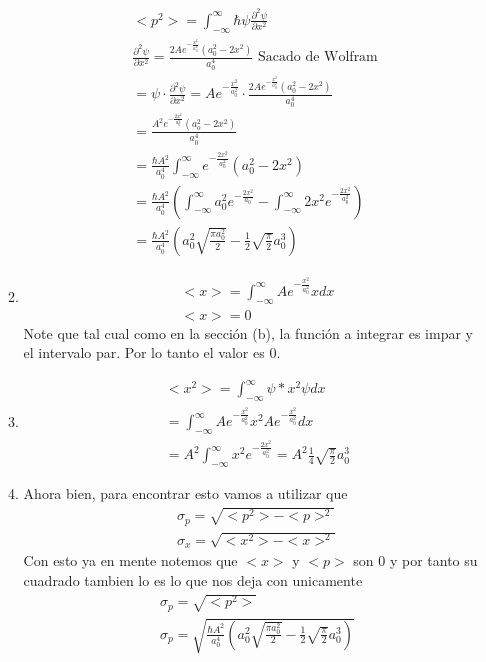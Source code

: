 \documentclass[12pt]{exam}
\begin{document}
\begin{enumerate}
\begin{enumerate}
				\begin{align*}
					&<p^2> = \int_{-\infty}^{\infty} \hbar \psi \frac{\partial^2 \psi}{\partial x^2}\\
					&\frac{\partial^2 \psi}{\partial x^2} = \frac{2Ae^{-\frac{x^2}{a_0^2}}(a_0^2-2x^2)}{a_0^4} \text{ Sacado de Wolfram }\\
					&= \psi \cdot \frac{\partial^2 \psi}{\partial x^2} = Ae^{-\frac{x^2}{a_0^2}}\cdot \frac{2Ae^{-\frac{x^2}{a_0^2}}(a_0^2-2x^2)}{a_0^4}\\
					&= \frac{A^2e^{-\frac{2x^2}{a_0^2}}(a_o^2-2x^2)}{a_0^4}\\
					&=\frac{\hbar A^2}{a_0^4} \int_{-\infty}^{\infty}e^{-\frac{2x^2}{a_0^2}}(a_0^2 -2x^2)\\
					&=\frac{\hbar A^2}{a_0^4} \left(\int_{-\infty}^{\infty}a_0^2e^{-\frac{2x^2}{a_0}} - \int_{-\infty}^{\infty}2x^2e^{-\frac{2x^2}{a_0^2}}\right)\\
					&=\frac{\hbar A^2}{a_0^4} \left(a_0^2\sqrt{\frac{\pi a_0^2}{2}}-\frac{1}{2}\sqrt{\frac{\pi}{2}}a_0^3\right)
				\end{align*}
			\item \begin{align*}
					&<x> = \int_{-\infty}^{\infty} Ae^{-\frac{x^2}{a_0^2}}x dx\\
					&<x> = 0
			\end{align*}
			Note que tal cual como en la sección (b), la función a integrar es impar y el intervalo par. Por lo tanto el valor es 0.
		\item \begin{align*}
				& <x^2> = \int_{-\infty}^{\infty}\psi*x^2\psi dx\\
				&=\int_{-\infty}^{\infty} Ae^{-\frac{x^2}{a_0^2}}x^2 Ae^{-\frac{x^2}{a_0^2}}dx\\
				&=A^2\int_{-\infty}^{\infty} x^2 e^{-\frac{2x^2}{a_0^2}}=A^2\frac{1}{4}\sqrt{\frac{\pi}{2}}a_0^3
		\end{align*}
	\item Ahora bien, para encontrar esto vamos a utilizar que
		\begin{align*}
			&\sigma_p = \sqrt{<p^2>-<p>^2}\\
			&\sigma_x = \sqrt{<x^2>-<x>^2}
		\end{align*}
			Con esto ya en mente notemos que $<x>$ y $<p>$ son 0 y por tanto su cuadrado tambien lo es lo que nos deja con unicamente
			\begin{align*}
				&\sigma_p = \sqrt{<p^2>}\\
				&\sigma_p = \sqrt{\frac{\hbar A^2}{a_0^4} \left(a_0^2\sqrt{\frac{\pi a_0^2}{2}}-\frac{1}{2}\sqrt{\frac{\pi}{2}}a_0^3\right)}\\

\end{align*}
\end{enumerate}
\end{enumerate}
\end{document}
